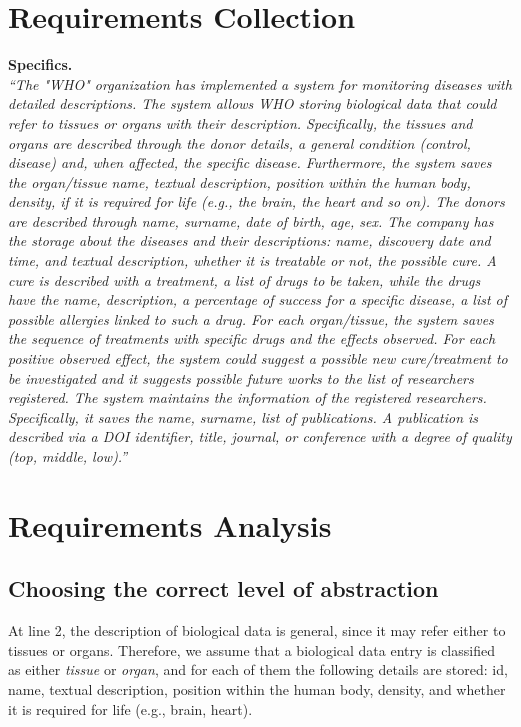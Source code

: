 \documentclass[11pt,a4paper]{article}
\begin{document}
\tableofcontents
\newpage

\section{Requirements Collection}
\label{sec:req-collection}
	\textbf{Specifics.}\\
\emph{``The "WHO" organization has implemented a system for monitoring diseases with detailed descriptions. The system allows WHO storing biological data that could refer to tissues or organs with their description. Specifically, the tissues and organs are described through the donor details, a general condition (control, disease) and, when affected, the specific disease. Furthermore, the system saves the organ/tissue name, textual description, position within the human body, density, if it is required for life (e.g., the brain, the heart and so on). The donors are described through name, surname, date of birth, age, sex. The company has the storage about the diseases and their descriptions: name, discovery date and time, and textual description, whether it is treatable or not, the possible cure. A cure is described with a treatment, a list of drugs to be taken, while the drugs have the name, description, a percentage of success for a specific disease, a list of possible allergies linked to such a drug. For each organ/tissue, the system saves the sequence of treatments with specific drugs and the effects observed. For each positive observed effect, the system could suggest a possible new cure/treatment to be investigated and it suggests possible future works to the list of researchers registered. The system maintains the information of the registered researchers. Specifically, it saves the name, surname, list of publications. A publication is described via a DOI identifier, title, journal, or conference with a degree of quality (top, middle, low).''}

\section{Requirements Analysis}

\subsection{Choosing the correct level of abstraction}

At line 2, the description of biological data is general, since it may refer either to tissues or organs. Therefore, we assume that a biological data entry is classified as either \textit{tissue} or \textit{organ}, and for each of them the following details are stored: id, name, textual description, position within the human body, density, and whether it is required for life (e.g., brain, heart).
\end{document}

